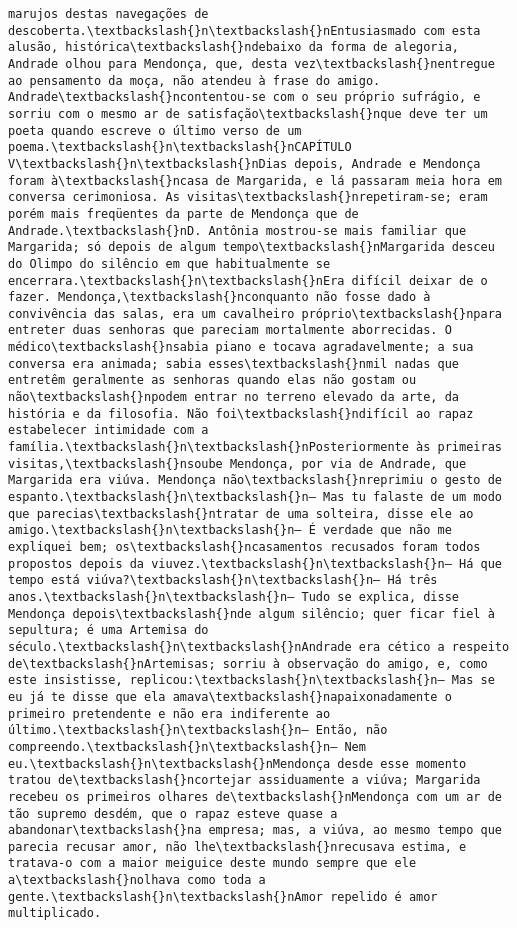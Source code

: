 \begin{Verbatim}[commandchars=\\\{\}]
marujos destas navegações de descoberta.\textbackslash{}n\textbackslash{}nEntusiasmado com esta alusão, histórica\textbackslash{}ndebaixo da forma de alegoria, Andrade olhou para Mendonça, que, desta vez\textbackslash{}nentregue ao pensamento da moça, não atendeu à frase do amigo. Andrade\textbackslash{}ncontentou-se com o seu próprio sufrágio, e sorriu com o mesmo ar de satisfação\textbackslash{}nque deve ter um poeta quando escreve o último verso de um poema.\textbackslash{}n\textbackslash{}nCAPÍTULO V\textbackslash{}n\textbackslash{}nDias depois, Andrade e Mendonça foram à\textbackslash{}ncasa de Margarida, e lá passaram meia hora em conversa cerimoniosa. As visitas\textbackslash{}nrepetiram-se; eram porém mais freqüentes da parte de Mendonça que de Andrade.\textbackslash{}nD. Antônia mostrou-se mais familiar que Margarida; só depois de algum tempo\textbackslash{}nMargarida desceu do Olimpo do silêncio em que habitualmente se encerrara.\textbackslash{}n\textbackslash{}nEra difícil deixar de o fazer. Mendonça,\textbackslash{}nconquanto não fosse dado à convivência das salas, era um cavalheiro próprio\textbackslash{}npara entreter duas senhoras que pareciam mortalmente aborrecidas. O médico\textbackslash{}nsabia piano e tocava agradavelmente; a sua conversa era animada; sabia esses\textbackslash{}nmil nadas que entretêm geralmente as senhoras quando elas não gostam ou não\textbackslash{}npodem entrar no terreno elevado da arte, da história e da filosofia. Não foi\textbackslash{}ndifícil ao rapaz estabelecer intimidade com a família.\textbackslash{}n\textbackslash{}nPosteriormente às primeiras visitas,\textbackslash{}nsoube Mendonça, por via de Andrade, que Margarida era viúva. Mendonça não\textbackslash{}nreprimiu o gesto de espanto.\textbackslash{}n\textbackslash{}n— Mas tu falaste de um modo que parecias\textbackslash{}ntratar de uma solteira, disse ele ao amigo.\textbackslash{}n\textbackslash{}n— É verdade que não me expliquei bem; os\textbackslash{}ncasamentos recusados foram todos propostos depois da viuvez.\textbackslash{}n\textbackslash{}n— Há que tempo está viúva?\textbackslash{}n\textbackslash{}n— Há três anos.\textbackslash{}n\textbackslash{}n— Tudo se explica, disse Mendonça depois\textbackslash{}nde algum silêncio; quer ficar fiel à sepultura; é uma Artemisa do século.\textbackslash{}n\textbackslash{}nAndrade era cético a respeito de\textbackslash{}nArtemisas; sorriu à observação do amigo, e, como este insistisse, replicou:\textbackslash{}n\textbackslash{}n— Mas se eu já te disse que ela amava\textbackslash{}napaixonadamente o primeiro pretendente e não era indiferente ao último.\textbackslash{}n\textbackslash{}n— Então, não compreendo.\textbackslash{}n\textbackslash{}n— Nem eu.\textbackslash{}n\textbackslash{}nMendonça desde esse momento tratou de\textbackslash{}ncortejar assiduamente a viúva; Margarida recebeu os primeiros olhares de\textbackslash{}nMendonça com um ar de tão supremo desdém, que o rapaz esteve quase a abandonar\textbackslash{}na empresa; mas, a viúva, ao mesmo tempo que parecia recusar amor, não lhe\textbackslash{}nrecusava estima, e tratava-o com a maior meiguice deste mundo sempre que ele a\textbackslash{}nolhava como toda a gente.\textbackslash{}n\textbackslash{}nAmor repelido é amor multiplicado. 
\end{Verbatim}
